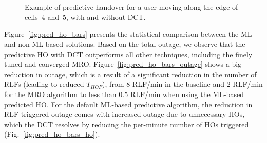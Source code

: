 			\begin{figure}[!ht]
				\centering
				 \\
				 \\
				\caption[Predictive handover example]{Example of predictive handover for a user moving along the edge of cells~$4$ and~$5$, with and without DCT.}
				\label{fig:cell_edge}
			\end{figure}
		
			Figure~\ref{fig:pred_ho_bars} presents the statistical comparison between the \ac{ML} and non-ML-based solutions.
			Based on the total outage, we observe that the predictive \ac{HO} with \ac{DCT} outperforms all other techniques, including the finely tuned and converged \ac{MRO}.
			Figure~\ref{fig:pred_ho_bars_outage} shows a big reduction in outage, which is a result of a significant reduction in the number of \acp{RLF} (leading to reduced $T_{HOF}$), from $8$ RLF/min in the baseline and $2$ RLF/min for the \ac{MRO} algorithm to less than $0.5$ RLF/min when using the \ac{ML}-based predicted \ac{HO}.
			For the default \ac{ML}-based predictive algorithm, the reduction in \ac{RLF}-triggered outage comes with increased outage due to unnecessary \acp{HO}, which the \ac{DCT} resolves by reducing the per-minute number of \acp{HO} triggered (Fig.~\ref{fig:pred_ho_bars_ho}).

